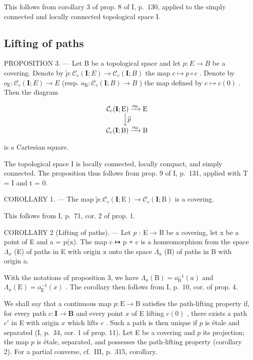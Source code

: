 This follows from corollary 3 of prop. 8 of I, p.~130, applied to the simply connected and locally connected topological space I.

\subsection{Lifting of paths}

PROPOSITION 3. --- Let B be a topological space and let \(p\colon E \to B\) be a covering. Denote by \(\widetilde{p}\colon \mathcal{C}_{c}(\mathbf{I};E) \to \mathcal{C}_{c}(\mathbf{I};B)\) the map \(c \mapsto p \circ c\) . Denote by \(o_{\mathrm{E}}\colon \mathcal{C}_{c}(\mathbf{I};E) \to E\) (resp. \(o_{\mathrm{B}}\colon \mathcal{C}_{c}(\mathbf{I};B) \to B\) ) the map defined by \(c \mapsto c(0)\) . Then the diagram

\[
\begin{array}{c} \mathcal {C} _ {c} (\mathbf {I}; \mathrm{E}) \xrightarrow {o _ {\mathrm{E}}} \mathrm{E} \\ \Big \downarrow \widetilde {p} \\ \mathcal {C} _ {c} (\mathbf {I}; \mathrm{B}) \xrightarrow {o _ {\mathrm{B}}} \mathrm{B} \end{array}
\]

is a Cartesian square.

The topological space I is locally connected, locally compact, and simply connected. The proposition thus follows from prop. 9 of I, p.~131, applied with T = I and t = 0.

COROLLARY 1. --- The map \(\widetilde{p}\colon\mathcal{C}_{c}(\mathbf{I};\mathrm{E})\to\mathcal{C}_{c}(\mathbf{I};\mathrm{B})\) is a covering.

This follows from I, p.~71, cor. 2 of prop. 1.

COROLLARY 2 (Lifting of paths). --- Let \(p\) : E → B be a covering, let x be a point of E and a = p(x). The map c ↦ p ∘ c is a homeomorphism from the space \(\Lambda_x\) (E) of paths in E with origin x onto the space \(\Lambda_a\) (B) of paths in B with origin a.

With the notations of proposition 3, we have \(\Lambda_{a}(\mathrm{B}) = o_{\mathrm{B}}^{-1}(a)\) and \(\Lambda_x(\mathrm{E}) = o_{\mathrm{E}}^{-1}(x)\) . The corollary then follows from I, p.~10, cor. of prop. 4.

We shall say that a continuous map \(p \colon \mathrm{E} \to \mathrm{B}\) satisfies the path-lifting property if, for every path \(c \colon \mathbf{I} \to \mathbf{B}\) and every point \(x\) of E lifting \(c(0)\) , there exists a path \(c'\) in E with origin \(x\) which lifts \(c\) . Such a path is then unique if \(p\) is étale and separated (I, p.~34, cor. 1 of prop. 11). Let E be a covering and \(p\) its projection; the map \(p\) is étale, separated, and possesses the path-lifting property (corollary 2). For a partial converse, cf.~III, p.~315, corollary.

